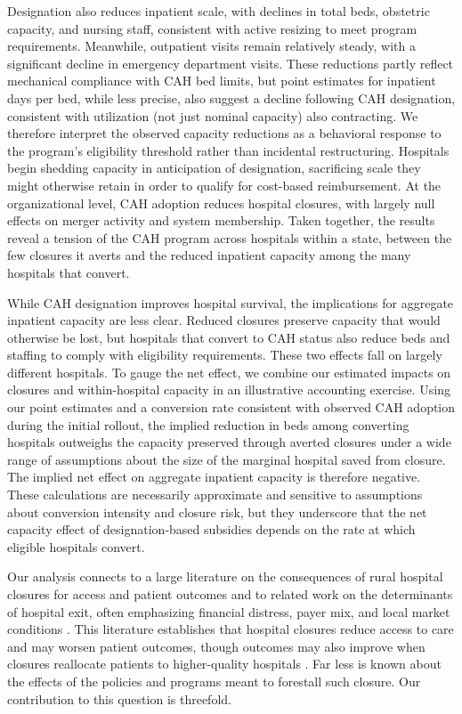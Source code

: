 \documentclass[a4paper, 12pt, twoside]{article}
\begin{document}
Designation also reduces inpatient scale, with declines in total beds, obstetric capacity, and nursing staff, consistent with active resizing to meet program requirements. Meanwhile, outpatient visits remain relatively steady, with a significant decline in emergency department visits. These reductions partly reflect mechanical compliance with CAH bed limits, but point estimates for inpatient days per bed, while less precise, also suggest a decline following CAH designation, consistent with utilization (not just nominal capacity) also contracting. We therefore interpret the observed capacity reductions as a behavioral response to the program's eligibility threshold rather than incidental restructuring. Hospitals begin shedding capacity in anticipation of designation, sacrificing scale they might otherwise retain in order to qualify for cost-based reimbursement. At the organizational level, CAH adoption reduces hospital closures, with largely null effects on merger activity and system membership. Taken together, the results reveal a tension of the CAH program across hospitals within a state, between the few closures it averts and the reduced inpatient capacity among the many hospitals that convert.

While CAH designation improves hospital survival, the implications for aggregate inpatient capacity are less clear. Reduced closures preserve capacity that would otherwise be lost, but hospitals that convert to CAH status also reduce beds and staffing to comply with eligibility requirements. These two effects fall on largely different hospitals. To gauge the net effect, we combine our estimated impacts on closures and within-hospital capacity in an illustrative accounting exercise. Using our point estimates and a conversion rate consistent with observed CAH adoption during the initial rollout, the implied reduction in beds among converting hospitals outweighs the capacity preserved through averted closures under a wide range of assumptions about the size of the marginal hospital saved from closure. The implied net effect on aggregate inpatient capacity is therefore negative. These calculations are necessarily approximate and sensitive to assumptions about conversion intensity and closure risk, but they underscore that the net capacity effect of designation-based subsidies depends on the rate at which eligible hospitals convert.

Our analysis connects to a large literature on the consequences of rural hospital closures for access and patient outcomes \citep{buchmueller2006, holmes2006, lindrooth2003, hsia2011, gujral2019, chandra2023-nber31789, chatterji2024} and to related work on the determinants of hospital exit, often emphasizing financial distress, payer mix, and local market conditions \citep{sloan2003, harrison2007}. This literature establishes that hospital closures reduce access to care and may worsen patient outcomes, though outcomes may also improve when closures reallocate patients to higher-quality hospitals \citep{battaglia2025}. Far less is known about the effects of the policies and programs meant to forestall such closure. Our contribution to this question is threefold.
\end{document}
